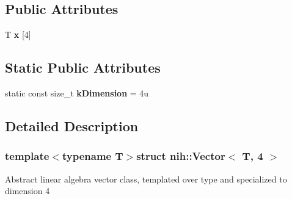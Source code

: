 \subsection*{\-Public \-Attributes}
\begin{DoxyCompactItemize}
\item 
\hypertarget{structnih_1_1_vector_3_01_t_00_014_01_4_a6936a0ae1930dfc97055b8f7f8ec8879}{
\-T {\bfseries x} \mbox{[}4\mbox{]}}
\label{structnih_1_1_vector_3_01_t_00_014_01_4_a6936a0ae1930dfc97055b8f7f8ec8879}

\end{DoxyCompactItemize}
\subsection*{\-Static \-Public \-Attributes}
\begin{DoxyCompactItemize}
\item 
\hypertarget{structnih_1_1_vector_3_01_t_00_014_01_4_a8bba71e89120a8b7ba4cd34610d9b3e0}{
static const size\-\_\-t {\bfseries k\-Dimension} = 4u}
\label{structnih_1_1_vector_3_01_t_00_014_01_4_a8bba71e89120a8b7ba4cd34610d9b3e0}

\end{DoxyCompactItemize}


\subsection{\-Detailed \-Description}
\subsubsection*{template$<$typename T$>$struct nih\-::\-Vector$<$ T, 4 $>$}

\-Abstract linear algebra vector class, templated over type and specialized to dimension 4 

